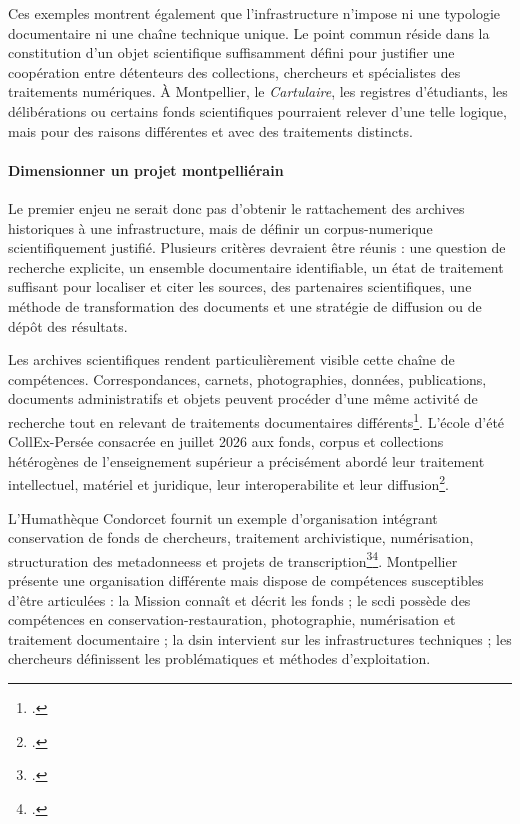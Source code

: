 Ces exemples montrent également que l'infrastructure n'impose ni une typologie documentaire ni une chaîne technique unique. Le point commun réside dans la constitution d'un objet scientifique suffisamment défini pour justifier une coopération entre détenteurs des collections, chercheurs et spécialistes des traitements numériques. À Montpellier, le \emph{Cartulaire}, les registres d'étudiants, les délibérations ou certains fonds scientifiques pourraient relever d'une telle logique, mais pour des raisons différentes et avec des traitements distincts.

\paragraph{Dimensionner un projet montpelliérain}

Le premier enjeu ne serait donc pas d'obtenir le rattachement des archives historiques à une infrastructure, mais de définir un \gls{corpus-numerique} scientifiquement justifié. Plusieurs critères devraient être réunis : une question de recherche explicite, un ensemble documentaire identifiable, un état de traitement suffisant pour localiser et citer les sources, des partenaires scientifiques, une méthode de transformation des documents et une stratégie de diffusion ou de dépôt des résultats.

Les archives scientifiques rendent particulièrement visible cette chaîne de compétences. Correspondances, carnets, photographies, données, publications, documents administratifs et objets peuvent procéder d'une même activité de recherche tout en relevant de traitements documentaires différents\footcite{Charmasson2006}. L'école d'été CollEx-Persée consacrée en juillet 2026 aux fonds, corpus et collections hétérogènes de l'enseignement supérieur a précisément abordé leur traitement intellectuel, matériel et juridique, leur \gls{interoperabilite} et leur diffusion\footcite{CampusCondorcetEcole2026}.

L'Humathèque Condorcet fournit un exemple d'organisation intégrant conservation de fonds de chercheurs, traitement archivistique, numérisation, structuration des \glspl{metadonnees} et projets de transcription\footcite{HumathequeArchives}\footcite{HumathequeRecherche}. Montpellier présente une organisation différente mais dispose de compétences susceptibles d'être articulées : la Mission connaît et décrit les fonds ; le \gls{scdi} possède des compétences en conservation-restauration, photographie, numérisation et traitement documentaire ; la \gls{dsin} intervient sur les infrastructures techniques ; les chercheurs définissent les problématiques et méthodes d'exploitation.

